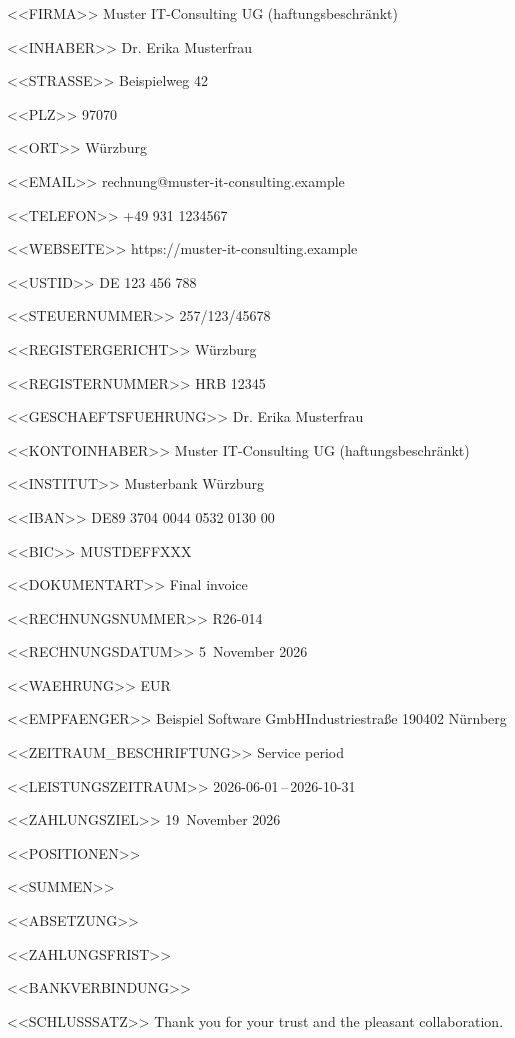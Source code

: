 <<FIRMA>>
Muster IT-Consulting UG (haftungsbeschränkt)

<<INHABER>>
Dr. Erika Musterfrau

<<STRASSE>>
Beispielweg 42

<<PLZ>>
97070

<<ORT>>
Würzburg

<<EMAIL>>
rechnung@muster-it-consulting.example

<<TELEFON>>
+49 931 1234567

<<WEBSEITE>>
https://muster-it-consulting.example

<<USTID>>
DE 123 456 788

<<STEUERNUMMER>>
257/123/45678

<<REGISTERGERICHT>>
Würzburg

<<REGISTERNUMMER>>
HRB 12345

<<GESCHAEFTSFUEHRUNG>>
Dr. Erika Musterfrau

<<KONTOINHABER>>
Muster IT-Consulting UG (haftungsbeschränkt)

<<INSTITUT>>
Musterbank Würzburg

<<IBAN>>
DE89 3704 0044 0532 0130 00

<<BIC>>
MUSTDEFFXXX

<<DOKUMENTART>>
Final invoice

<<RECHNUNGSNUMMER>>
R26-014

<<RECHNUNGSDATUM>>
5~November 2026

<<WAEHRUNG>>
EUR

<<EMPFAENGER>>
Beispiel Software GmbH\zeilenwechsel{}Industriestraße 1\zeilenwechsel{}90402 Nürnberg

<<ZEITRAUM_BESCHRIFTUNG>>
Service period

<<LEISTUNGSZEITRAUM>>
2026-06-01\,–\,2026-10-31

<<ZAHLUNGSZIEL>>
19~November 2026

<<POSITIONEN>>

<<SUMMEN>>
   \summentrenner{}

<<ABSETZUNG>>

<<ZAHLUNGSFRIST>>

<<BANKVERBINDUNG>>
\bankblock{}

<<SCHLUSSSATZ>>
Thank you for your trust and the pleasant collaboration.
